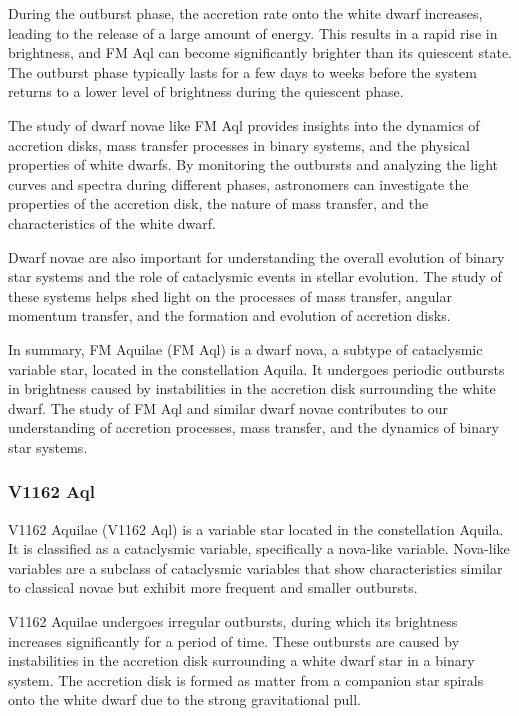 During the outburst phase, the accretion rate onto the white dwarf increases, leading to the release of a large amount of energy. This results in a rapid rise in brightness, and FM Aql can become significantly brighter than its quiescent state. The outburst phase typically lasts for a few days to weeks before the system returns to a lower level of brightness during the quiescent phase.

The study of dwarf novae like FM Aql provides insights into the dynamics of accretion disks, mass transfer processes in binary systems, and the physical properties of white dwarfs. By monitoring the outbursts and analyzing the light curves and spectra during different phases, astronomers can investigate the properties of the accretion disk, the nature of mass transfer, and the characteristics of the white dwarf.

Dwarf novae are also important for understanding the overall evolution of binary star systems and the role of cataclysmic events in stellar evolution. The study of these systems helps shed light on the processes of mass transfer, angular momentum transfer, and the formation and evolution of accretion disks.

In summary, FM Aquilae (FM Aql) is a dwarf nova, a subtype of cataclysmic variable star, located in the constellation Aquila. It undergoes periodic outbursts in brightness caused by instabilities in the accretion disk surrounding the white dwarf. The study of FM Aql and similar dwarf novae contributes to our understanding of accretion processes, mass transfer, and the dynamics of binary star systems.


\subsubsection*{ V1162 Aql }
V1162 Aquilae (V1162 Aql) is a variable star located in the constellation Aquila. It is classified as a cataclysmic variable, specifically a nova-like variable. Nova-like variables are a subclass of cataclysmic variables that show characteristics similar to classical novae but exhibit more frequent and smaller outbursts.

V1162 Aquilae undergoes irregular outbursts, during which its brightness increases significantly for a period of time. These outbursts are caused by instabilities in the accretion disk surrounding a white dwarf star in a binary system. The accretion disk is formed as matter from a companion star spirals onto the white dwarf due to the strong gravitational pull.

